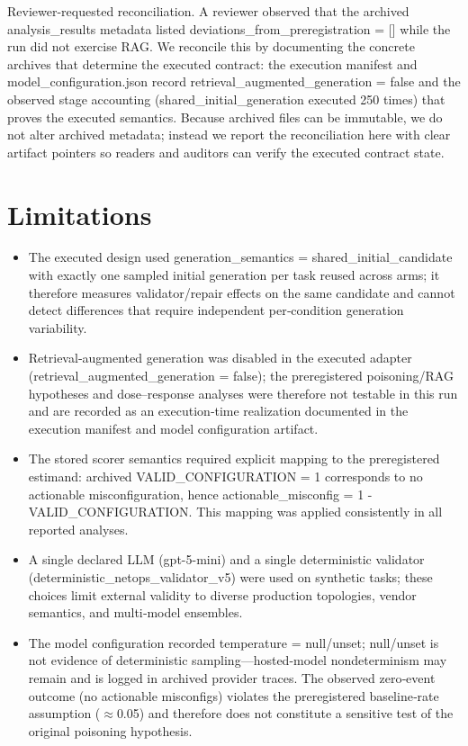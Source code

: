 \documentclass[conference]{IEEEtran}
\begin{document}
Reviewer-requested reconciliation. A reviewer observed that the archived analysis\_results metadata listed deviations\_from\_preregistration = [] while the run did not exercise RAG. We reconcile this by documenting the concrete archives that determine the executed contract: the execution manifest and model\_configuration.json record retrieval\_augmented\_generation = false and the observed stage accounting (shared\_initial\_generation executed 250 times) that proves the executed semantics. Because archived files can be immutable, we do not alter archived metadata; instead we report the reconciliation here with clear artifact pointers so readers and auditors can verify the executed contract state.

\section{Limitations}
\begin{itemize}
\item The executed design used generation\_semantics = shared\_initial\_candidate with exactly one sampled initial generation per task reused across arms; it therefore measures validator/repair effects on the same candidate and cannot detect differences that require independent per‑condition generation variability.
\item Retrieval‑augmented generation was disabled in the executed adapter (retrieval\_augmented\_generation = false); the preregistered poisoning/RAG hypotheses and dose--response analyses were therefore not testable in this run and are recorded as an execution‑time realization documented in the execution manifest and model configuration artifact.
\item The stored scorer semantics required explicit mapping to the preregistered estimand: archived VALID\_CONFIGURATION = 1 corresponds to no actionable misconfiguration, hence actionable\_misconfig = 1 - VALID\_CONFIGURATION. This mapping was applied consistently in all reported analyses.
\item A single declared LLM (gpt-5-mini) and a single deterministic validator (deterministic\_netops\_validator\_v5) were used on synthetic tasks; these choices limit external validity to diverse production topologies, vendor semantics, and multi‑model ensembles.
\item The model configuration recorded temperature = null/unset; null/unset is not evidence of deterministic sampling---hosted-model nondeterminism may remain and is logged in archived provider traces. The observed zero‑event outcome (no actionable misconfigs) violates the preregistered baseline‑rate assumption (\ensuremath{\approx}0.05) and therefore does not constitute a sensitive test of the original poisoning hypothesis.
\end{itemize}
\end{document}
